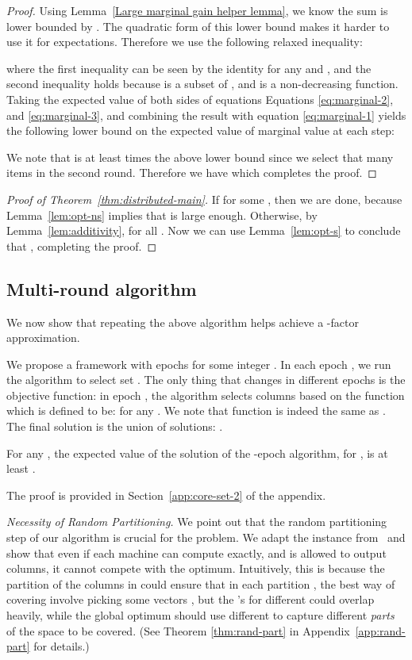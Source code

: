 \documentclass{article}
\begin{document}
\begin{proof}
Using Lemma~\ref{Large marginal gain helper lemma}, we know the sum  is lower bounded by . The quadratic form of this lower bound makes it harder to use it for expectations. Therefore we use the following relaxed inequality:



where the first inequality can be seen by the identity  for any  and , and the second inequality holds because  is a subset of , and  is a non-decreasing function. Taking the expected value of both sides of equations Equations \eqref{eq:marginal-2}, and \eqref{eq:marginal-3}, and combining the result with equation \eqref{eq:marginal-1} yields the following lower bound on the expected value of marginal value at each step:



We note that  is at least  times the above lower bound since we select that many items in the second round. Therefore we have  which completes the proof.
\fi
\end{proof}
\begin{proof}[Proof of Theorem~\ref{thm:distributed-main}]
If  for some , then we are done, because Lemma~\ref{lem:opt-ns} implies that  is large enough.  Otherwise, by Lemma~\ref{lem:additivity},  for all . 
Now we can use Lemma~\ref{lem:opt-s} to conclude that , completing the proof.
\end{proof}

\subsection{Multi-round algorithm}
We now show that repeating the above algorithm helps achieve a -factor approximation.

We propose a framework with  epochs for some integer . In each epoch , we run the  algorithm to select set . The only thing that changes in different epochs is the objective function: in epoch , the algorithm selects columns based on the function  which is defined to be:  for any . We note that function  is indeed the same as . The final solution is the union of solutions: . 


\begin{thm}\label{thm:core-set-2}
For any , the expected value of the solution of the -epoch  algorithm, for , is at least .
\end{thm}

The proof is provided in Section~\ref{app:core-set-2} of the appendix.

{\em Necessity of Random Partitioning.}  We point out that the random partitioning step of our algorithm is crucial for the  problem.  We adapt the instance from~\cite{VahabPODS2014} and show that even if each machine can compute  exactly, and is allowed to output  columns, it cannot compete with the optimum. Intuitively, this is because the partition of the columns in  could ensure that in each partition , the best way of covering  involve picking some vectors , but the 's for different  could overlap heavily, while the global optimum should use different  to capture different {\em parts} of the space to be covered. (See Theorem \ref{thm:rand-part} in Appendix~\ref{app:rand-part} for details.)
\end{document}

